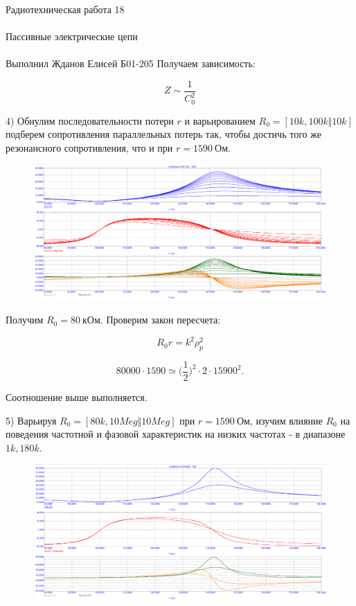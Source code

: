 \documentclass{astroedu-lab}
\begin{document}
\begin{problem}{\huge Радиотехническая работа 18\\\\Пассивные электрические цепи\\\\Выполнил Жданов Елисей Б01-205}
Получаем зависимость:

\[Z \sim \frac{1}{C_0^2}\]

4) Обнулим последовательности потери $r$ и варьированием $R_0 = [10k, 100k \Vert 10k]$ подберем сопротивления параллельных потерь так, чтобы достичь того же резонансного сопротивления, что и при $r = 1590 \: \text{Ом}$.

\begin{figure}[h!]
\centering
\includegraphics[scale=0.4]{combined_AC4.png}
\label{fig:Image1}
\end{figure}

Получим $R_0 = 80 \: \text{кОм}$. Проверим закон пересчета:

\[R_0 r = k^2 \rho_p^2\]

\[80000 \cdot 1590 \simeq \Big(\frac{1}{2}\Big)^2 \cdot 2 \cdot 15900^2.\]

Соотношение выше выполняется.

5) Варьируя $R_0 = [80k, 10Meg \Vert 10Meg]$ при $r = 1590 \: \text{Ом}$, изучим влияние $R_0$ на поведения частотной и фазовой характеристик на низких частотах - в диапазоне $1k, 180k$.

\begin{figure}[h!]
\centering
\includegraphics[scale=0.4]{combined_AC5.png}
\label{fig:Image1}
\end{figure}


\end{problem}
\end{document}
